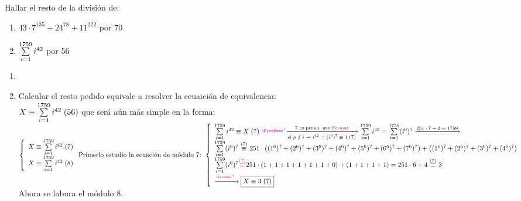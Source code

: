Hallar el resto de la división de:
\begin{enumerate}[label=\roman*)]
	\item $43 \cdot 7^{135} + 24^{78} + 11^{222}$ por 70
	\item $\sum\limits_{i=1}^{1759} i^{42}$ por 56
\end{enumerate}

\separadorCorto

\begin{enumerate}[label=\roman*)]
	\item \hacer

	\item Calcular el resto pedido equivale a resolver la ecuaición de equivalencia:\\
	      $ \congruencia{X}{\sumLocal i^{42}}{56} $ que será aún más simple en la forma:
	      $\llave{l}{
			      \congruencia{X}{\sumLocal i^{42}}{7}\\
			      \congruencia{X}{\sumLocal i^{42}}{8}
		      }\\
		      \text{Primerlo estudio la ecuación de módulo 7: }\\
		      \llave{l}{
                \congruencia{\sumLocal i^{42}}{X}{7} \llamada{1}

			      \flecha{7 es primo, uso \magenta{Fermat}}[si $p \noDivide i \to i^{42} = \congruencia{(i^6)^7}{1}{7}$]
			      \sumLocal i^{42} = \sumLocal (i^6)^7
			      \flecha{$251 \cdot 7 + 2 = 1759$}\\
			      \sumLocal (i^6)^7 \conga7 251 \cdot \parentesis{(1^6)^7 + (2^6)^7 + (3^6)^7 + (4^6)^7 + (5^6)^7 + (6^6)^7 + (7^6)^7} + \parentesis{(1^6)^7 + (2^6)^7 + (3^6)^7 + (4^6)^7}\\
			      \sumLocal (i^6)^7 \magenta{\conga7 } 251 \cdot \parentesis{1 + 1 + 1 + 1 + 1 + 1 + 0} + \parentesis{1 + 1 + 1 + 1} =
			      251 \cdot  6 + 4 \conga7 3\\
                  \flecha{$\llamada{1}$ } \boxed{\congruencia{X}{3}{7}}\\
		      }$\\
	      Ahora se labura el módulo 8.\\


\end{enumerate}
